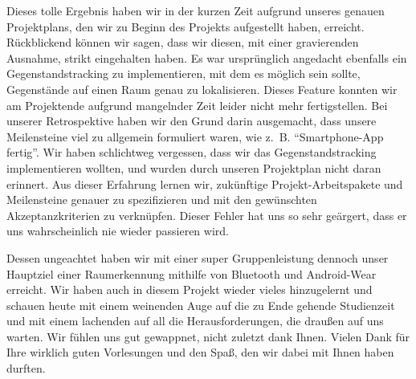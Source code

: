 Dieses tolle Ergebnis haben wir in der kurzen Zeit aufgrund unseres genauen Projektplans, den wir zu Beginn des Projekts aufgestellt haben, erreicht. Rückblickend können wir sagen, dass wir diesen, mit einer gravierenden Ausnahme, strikt eingehalten haben. Es war ursprünglich angedacht ebenfalls ein Gegenstandstracking zu implementieren, mit dem es möglich sein sollte, Gegenstände auf einen Raum genau zu lokalisieren. Dieses Feature konnten wir am Projektende aufgrund mangelnder Zeit leider nicht mehr fertigstellen. Bei unserer Retrospektive haben wir den Grund darin ausgemacht, dass unsere Meilensteine viel zu allgemein formuliert waren, wie z.~B. “Smartphone-App fertig”. Wir haben schlichtweg vergessen, dass wir das Gegenstandstracking implementieren wollten, und wurden durch unseren Projektplan nicht daran erinnert. Aus dieser Erfahrung lernen wir, zukünftige Projekt-Arbeitspakete und Meilensteine genauer zu spezifizieren und mit den gewünschten Akzeptanzkriterien zu verknüpfen. Dieser Fehler hat uns so sehr geärgert, dass er uns wahrscheinlich nie wieder passieren wird.

Dessen ungeachtet haben wir mit einer super Gruppenleistung dennoch unser Hauptziel einer Raumerkennung mithilfe von Bluetooth und Android-Wear erreicht. Wir haben auch in diesem Projekt wieder vieles hinzugelernt und schauen heute mit einem weinenden Auge auf die zu Ende gehende Studienzeit und mit einem lachenden auf all die Herausforderungen, die draußen auf uns warten. Wir fühlen uns gut gewappnet, nicht zuletzt dank Ihnen. Vielen Dank für Ihre wirklich guten Vorlesungen und den Spaß, den wir dabei mit Ihnen haben durften. 

